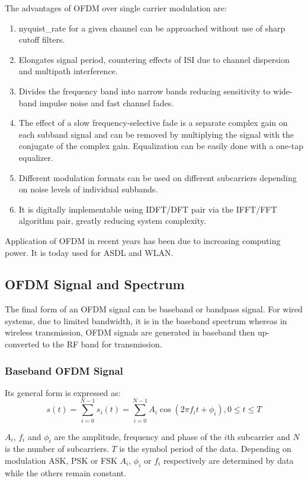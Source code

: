 The advantages of \gls{OFDM} over single carrier modulation are:
\begin{enumerate}
	\item \gls{nyquist_rate} for a given channel can be approached without use of sharp cutoff filters.
	\item Elongates signal period, countering effects of \gls{ISI} due to channel dispersion and multipath interference.
	\item Divides the frequency band into narrow bands reducing sensitivity to wide-band impulse noise and fast channel fades.
	\item The effect of a slow frequency-selective fade is a separate complex gain on each \gls{subband} signal and can be removed by multiplying the signal with the conjugate of the complex gain. Equalization can be easily done with a one-tap equalizer.
	\item Different modulation formats can be used on different \gls{subcarrier}s depending on noise levels of individual \gls{subband}s.
	\item It is digitally implementable using \gls{IDFT}/\gls{DFT} pair via the \gls{IFFT}/\gls{FFT} algorithm pair, greatly reducing system complexity.
\end{enumerate}
Application of \gls{OFDM} in recent years has been due to increasing computing power. It is today used for \gls{ASDL} and \gls{WLAN}.

\subsection{OFDM Signal and Spectrum}
The final form of an OFDM signal can be baseband or bandpass signal. For wired systems, due to limited bandwidth, it is in the baseband spectrum whereas in wireless transmission, \gls{OFDM} signals are generated in baseband then up-converted to the \gls{RF} band for transmission.

\subsubsection{Baseband OFDM Signal}
Its general form is expressed as:
$$s(t) = \sum_{i=0}^{N-1}s_i(t) = \sum_{i=0}^{N-1}A_i\cos\left( 2\pi f_it + \phi_i\right), 0\leq t\leq T$$

$A_i$, $f_i$ and $\phi_i$ are the amplitude, frequency and phase of the $i$th \gls{subcarrier} and $N$ is the number of \gls{subcarrier}s. $T$ is the symbol period of the data. Depending on modulation \gls{ASK}, \gls{PSK} or \gls{FSK} $A_i$, $\phi_i$ or $f_i$ respectively are determined by data while the others remain constant.

